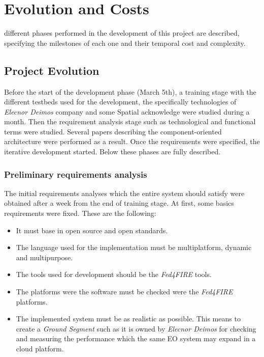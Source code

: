 \chapter{Evolution and Costs}
\label{chap:evolution}
 different phases performed in the development of this project are described,
specifying the milestones of each one and their temporal cost and complexity.


\section{Project Evolution}
\label{section:evolution}

Before the start of the development phase (March 5th), a training stage with
the different testbeds used for the development, the specifically technologies of
\emph{Elecnor Deimos} company and some Spatial acknowledge were studied during a month. Then the
requirement analysis stage such as technological and functional terms were
studied. Several papers describing the component-oriented architecture were
performed as a result. Once the requirements were specified, the iterative
development started. Below these phases are fully described.


\subsection{Preliminary requirements analysis}

The initial requirements analyses which the entire system should satisfy were
obtained after a week from the end of training stage.
At first, some basics requirements were fixed. These are the following:
\begin{itemize}
\item It must base in open source and open standards.
\item The language used for the implementation must be multiplatform, dynamic
  and multipurpose.
\item The tools used for development should be the \emph{Fed4FIRE} tools.
\item The platforms were the software must be checked were the \emph{Fed4FIRE}
  platforms.
\item The implemented system must be as realistic as possible. This means to
  create a \emph{Ground Segment} such as it is owned by \emph{Elecnor Deimos}
  for checking and measuring the performance which the same \acl{EO} system may
  expand in a cloud platform.
\end{itemize}

